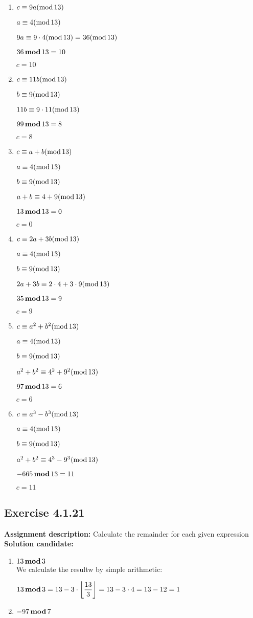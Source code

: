 \documentclass{report}
\newcommand{\cent}[1]{\begin{center}#1\end{center}}
\newcommand{\AssignmentDescription}{\textbf{Assignment description: }}
\newcommand{\Solution}{\textbf{Solution candidate: }}
\newcommand{\Exercise}[1]{\subsection{Exercise #1}}
\newcommand{\defaultEnumerateLabel}{\textbf{\alph*.}}
\newcommand{\modInline}{\text{mod\,}}
\newcommand{\modFunc}{\text{\,\textbf{mod}\,}}
\newcommand{\MyItem}[1]{\item #1\\}
\newcommand{\Floor}[1]{\left \lfloor{#1}\right \rfloor }
\begin{document}
\begin{enumerate}[label=\defaultEnumerateLabel]
	\begin{enumerate}[label=\defaultEnumerateLabel]
		\MyItem{$c \equiv 9a (\modInline 13)$}
		
		\cent{$a \equiv 4(\modInline 13)$}
		\cent{$9a \equiv 9\cdot 4(\modInline 13) = 36(\modInline 13)$}
		\cent{$36 \modFunc 13 = 10$}
		\cent{$ c = 10$}
		
		\MyItem{$c \equiv 11b (\modInline 13)$}
		
		\cent{$b \equiv 9 (\modInline 13)$}
		\cent{$11b\equiv 9 \cdot 11 (\modInline 13)$}
		\cent{$99 \modFunc 13 = 8$}
		\cent{$c = 8$}
		
		\MyItem{$c \equiv a+b (\modInline 13)$}
		\cent{$a \equiv 4 (\modInline 13)$}
		\cent{$b \equiv 9 (\modInline 13)$}
		\cent{$a+b\equiv 4+9 (\modInline 13)$}
		\cent{$13 \modFunc 13 = 0$}
		\cent{$c = 0$}
		
		\MyItem{$c \equiv 2a+3b (\modInline 13)$}
		
		\cent{$a \equiv 4 (\modInline 13)$}
		\cent{$b \equiv 9 (\modInline 13)$}
		\cent{$2a+3b\equiv 2 \cdot 4+3 \cdot 9 (\modInline 13)$}
		\cent{$35 \modFunc 13 = 9$}
		\cent{$c = 9$}
		
		\MyItem{$c \equiv a^2 + b^2 (\modInline 13)$}
		
		\cent{$a \equiv 4 (\modInline 13)$}
		\cent{$b \equiv 9 (\modInline 13)$}
		\cent{$a^2+b^2\equiv 4^2+9^2 (\modInline 13)$}
		\cent{$97 \modFunc 13 = 6$}
		\cent{$c = 6$}
		
		\MyItem{$c \equiv a^3 - b^3 (\modInline 13)$}
		
		\cent{$a \equiv 4 (\modInline 13)$}
		\cent{$b \equiv 9 (\modInline 13)$}
		\cent{$a^2+b^2\equiv 4^3-9^3 (\modInline 13)$}
		\cent{$-665 \modFunc 13 = 11$}
		\cent{$c = 11$}
		
	\end{enumerate}
	
	\Exercise{4.1.21}
	
	\AssignmentDescription
	Calculate the remainder for each given expression\\
	
	\Solution
	\begin{enumerate}[label=\defaultEnumerateLabel]
		
		\MyItem{$13 \modFunc 3$}
		
		We calculate the resultw by simple arithmetic:
		
		\cent{$13 \modFunc 3 = 13 -  3 \cdot  \Floor{\dfrac{13}{3}} = 13 - 3 \cdot 4 = 13-12=1$}
		
		\MyItem{$-97 \modFunc 7$}
		

\end{enumerate}
\end{enumerate}
\end{document}
